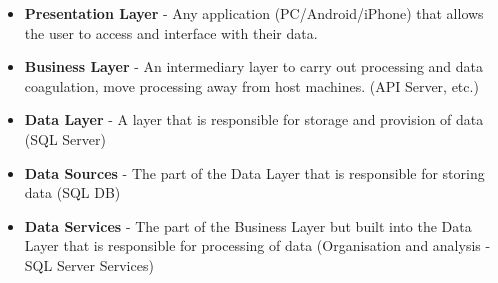 \documentclass[a4paper,11pt]{proc}
\begin{document}
\begin{itemize}
    \item \textbf{Presentation Layer} - Any application (PC/Android/iPhone) that allows the user to access and interface with their data.
    \item \textbf{Business Layer} - An intermediary layer to carry out processing and data coagulation, move processing away from host machines. (API Server, etc.)
    \item \textbf{Data Layer} - A layer that is responsible for storage and provision of data (SQL Server)
    \item \textbf{Data Sources} - The part of the Data Layer that is responsible for storing data (SQL DB)
    \item \textbf{Data Services} - The part of the Business Layer but built into the Data Layer that is responsible for processing of data (Organisation and analysis - SQL Server Services)
\end{itemize}
\end{document}
